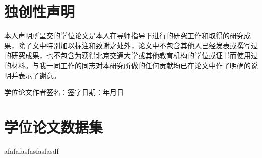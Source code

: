 
\chapter{独创性声明}
{\fontsize{10.5}{16}\selectfont
本人声明所呈交的学位论文是本人在导师指导下进行的研究工作和取得的研究成果，除了文中特别加以标注和致谢之处外，论文中不包含其他人已经发表或撰写过的研究成果，也不包含为获得北京交通大学或其他教育机构的学位或证书而使用过的材料。与我一同工作的同志对本研究所做的任何贡献均已在论文中作了明确的说明并表示了谢意。
\vspace{3em}
\par
学位论文作者签名：\hspace{6.5em}签字日期：\hspace{4em}年\hspace{2em}月\hspace{2em}日
}


\chapter{学位论文数据集}
afafafasfasfasfasdf
